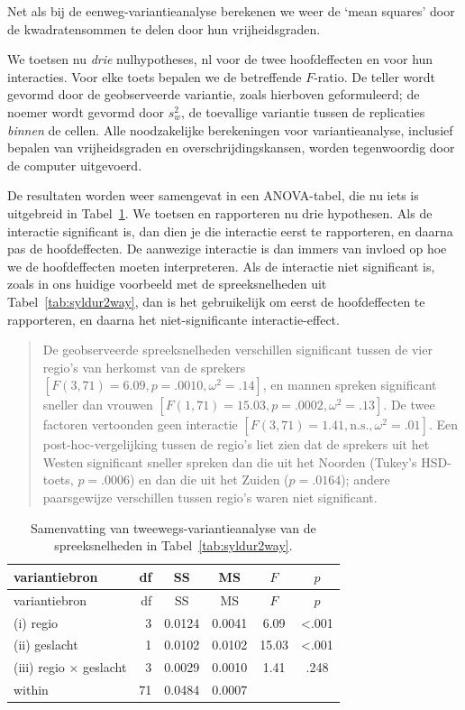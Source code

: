 \documentclass[
]{book}
\begin{document}
Net als bij de eenweg-variantieanalyse berekenen we weer de `mean
squares' door de kwadratensommen te delen door hun vrijheidsgraden.

We toetsen nu \emph{drie} nulhypotheses, nl voor de twee hoofdeffecten en
voor hun interacties. Voor elke toets bepalen we de betreffende
\(F\)-ratio. De teller wordt gevormd door de geobserveerde variantie,
zoals hierboven geformuleerd; de noemer wordt gevormd door \(s^2_w\), de
toevallige variantie tussen de replicaties \emph{binnen} de cellen. Alle
noodzakelijke berekeningen voor variantieanalyse, inclusief bepalen van
vrijheidsgraden en overschrijdingskansen, worden tegenwoordig door de
computer uitgevoerd.

De resultaten worden weer samengevat in een ANOVA-tabel, die nu iets is
uitgebreid in Tabel~\ref{tab:syldur2way-anova}. We toetsen en rapporteren nu drie
hypothesen. Als de interactie significant is, dan dien je die interactie
eerst te rapporteren, en daarna pas de hoofdeffecten. De aanwezige
interactie is dan immers van invloed op hoe we de hoofdeffecten moeten
interpreteren. Als de interactie niet significant is, zoals in ons
huidige voorbeeld met de spreeksnelheden uit
Tabel~\ref{tab:syldur2way}, dan is het gebruikelijk om eerst de
hoofdeffecten te rapporteren, en daarna het niet-significante
interactie-effect.

\begin{quote}
De geobserveerde spreeksnelheden verschillen significant tussen de vier
regio's van herkomst van de sprekers
\([F(3,71)=6.09, p=.0010, \omega^2=.14]\), en mannen spreken significant
sneller dan vrouwen \([F(1,71)=15.03, p=.0002, \omega^2=.13]\).
De twee factoren vertoonden geen interactie
\([F(3,71)=1.41, \textrm{n.s.}, \omega^2=.01]\).
Een post-hoc-vergelijking tussen de regio's liet zien dat de sprekers uit
het Westen significant sneller spreken dan die uit het Noorden (Tukey's
HSD-toets, \(p=.0006\)) en dan die uit het Zuiden (\(p=.0164\)); andere
paarsgewijze verschillen tussen regio's waren niet significant.
\end{quote}

\begin{longtable}[]{@{}lrcccc@{}}
\caption{\label{tab:syldur2way-anova} Samenvatting van tweewegs-variantieanalyse van de spreeksnelheden in Tabel~\ref{tab:syldur2way}.}\tabularnewline
\toprule
variantiebron & df & SS & MS & \(F\) & \(p\)\tabularnewline
\midrule
\endfirsthead
\toprule
variantiebron & df & SS & MS & \(F\) & \(p\)\tabularnewline
\midrule
\endhead
(i) regio & 3 & 0.0124 & 0.0041 & 6.09 & \textless.001\tabularnewline
(ii) geslacht & 1 & 0.0102 & 0.0102 & 15.03 & \textless.001\tabularnewline
(iii) regio \(\times\) geslacht & 3 & 0.0029 & 0.0010 & 1.41 & .248\tabularnewline
within & 71 & 0.0484 & 0.0007 & &\tabularnewline
\bottomrule
\end{longtable}
\end{document}
